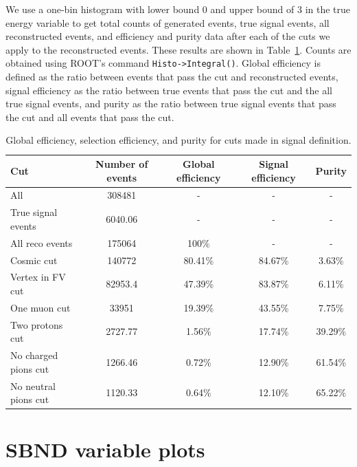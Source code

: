\documentclass{article}
\begin{document}
We use a one-bin histogram with lower bound $0$ and upper bound of $3$ in the true energy variable to get total counts of generated events, true signal events, all reconstructed events, and efficiency and purity data after each of the cuts we apply to the reconstructed events. These results are shown in Table~\ref{table:cut-efficiency-purity}. Counts are obtained using ROOT's command \verb|Histo->Integral()|. Global efficiency is defined as the ratio between events that pass the cut and reconstructed events, signal efficiency as the ratio between true events that pass the cut and the all true signal events, and purity as the ratio between true signal events that pass the cut and all events that pass the cut.

\begin{table}
    \begin{center}
        \begin{tabular}{|l|cccc|}
        \hline
        \textbf{Cut}         & \textbf{Number of events} & \textbf{Global efficiency} & \textbf{Signal efficiency} & \textbf{Purity} \\ \hline
        All                  & 308481  & -       & -       & -      \\
        True signal events   & 6040.06 & -       & -       & -      \\
        All reco events      & 175064  & 100\%   & -       & -      \\
        Cosmic cut           & 140772  & 80.41\% & 84.67\% & 3.63\% \\
        Vertex in FV cut     & 82953.4 & 47.39\% & 83.87\% & 6.11\% \\
        One muon cut         & 33951   & 19.39\% & 43.55\% & 7.75\% \\
        Two protons cut      & 2727.77 & 1.56\%  & 17.74\% & 39.29\% \\
        No charged pions cut & 1266.46 & 0.72\%  & 12.90\% & 61.54\% \\
        No neutral pions cut & 1120.33 & 0.64\%  & 12.10\% & 65.22\% \\ \hline
        \end{tabular}
    \end{center}
    \caption{Global efficiency, selection efficiency, and purity for cuts made in signal definition.}
    \label{table:cut-efficiency-purity}
\end{table}

\section{SBND variable plots}
\end{document}
